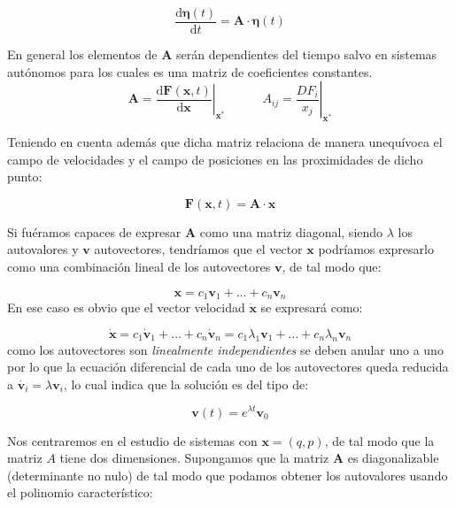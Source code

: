 \documentclass[12pt,a4paper]{article}
\numberwithin{equation}{section}
\numberwithin{figure}{section}
\newcommand{\D}{\mathrm{d}}
\newcommand{\derivadas}[2]{\frac{\D #1}{\D #2}}
\newcommand{\tquad}{\quad \quad \quad}
\newcommand{\vn}{\mathbf{v}}
\newcommand{\xn}{\mathbf{x}}
\newcommand{\Fn}{\mathbf{F}}
\newcommand{\An}{\mathbf{A}}
\newcommand{\neta}{\boldsymbol{\eta}}
\begin{document}
\begin{equation}
\derivadas{\neta (t)}{t} = \An \cdot \neta (t)
\end{equation}

 En general los elementos de $\An$ serán dependientes del tiempo salvo en sistemas autónomos para los cuales es una matriz de coeficientes constantes. \\

\begin{equation}
\An = \left. \dfrac{\D \Fn(\xn,t)}{\D \xn} \right|_{\xn^*} \tquad A_{ij} = \left. \dfrac{D F_i}{x_j} \right|_{\xn^*}
\end{equation}

Teniendo en cuenta además que dicha matriz relaciona de manera unequívoca el campo de velocidades y el campo de posiciones en las proximidades de dicho punto:

\begin{equation}
\Fn(\xn,t) = \An \cdot \xn
\end{equation}

Si fuéramos capaces de expresar $\An$ como una matriz diagonal, siendo $\lambda$ los autovalores y $\vn$ autovectores, tendríamos que el vector $\xn$ podríamos expresarlo como una combinación lineal de los autovectores $\vn$, de tal modo que:

\begin{equation}
\xn = c_1 \vn_1 + \ldots + c_n \vn_n
\end{equation}
En ese caso es obvio que el vector velocidad $\dot{\xn}$ se expresará como:

\begin{equation}
\dot{\xn} = c_1 \dot{\vn}_1 + \ldots + c_n \dot{\vn}_n = c_1 \lambda_1 \vn_1 + \ldots + c_n \lambda_n \vn_n
\end{equation}
como los autovectores son \textit{linealmente independientes} se deben anular uno a uno por lo que la ecuación diferencial de cada uno de los autovectores queda reducida a $\dot{\vn_i} = \lambda \vn_i$, lo cual indica que la solución es del tipo de:

\begin{equation}
\vn (t) = e^{\lambda t} \vn_0
\end{equation}


Nos centraremos en el estudio de sistemas con $\xn = (q,p)$, de tal modo que la matriz $A$ tiene dos dimensiones. Supongamos que la matriz $\An$ es diagonalizable (determinante no nulo) de tal modo que podamos obtener los autovalores usando el polinomio característico:
\end{document}
